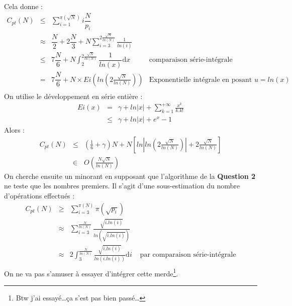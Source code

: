 \documentclass[../main.tex]{subfiles}
\begin{document}
Cela donne :
$$\begin{array}{lcll}
C_{pt}(N) & \leq & \displaystyle\sum_{i = 1}^{\pi(\sqrt{N})}i\dfrac{N}{p_i} \\
& \approx & \dfrac{N}{2} + 2\dfrac{N}{3} + N\displaystyle\sum_{i = 3}^{2\frac{\sqrt{N}}{ln(N)}}\frac{1}{ln(i)} \\
& \leq & 7\dfrac{N}{6} + N\displaystyle\int_{2}^{2\frac{\sqrt{N}}{ln(N)}}\dfrac{1}{ln(x)}\mathrm{d}x & \text{comparaison série-intégrale}\\
& = & 7\dfrac{N}{6} + N\times Ei\left(ln\left(2\frac{\sqrt{N}}{ln(N)}\right)\right) & \text{Exponentielle intégrale en posant $u = ln(x)$} \\
\end{array}$$
On utilise le développement en série entière :
$$\begin{array}{lcl}Ei(x) & = & \gamma + ln|x| + \displaystyle\sum_{k = 1}^{+\infty}\frac{x^k}{k.k!} \\
& \leq & \gamma + ln|x| + e^x - 1
\end{array}$$
Alors :
$$\begin{array}{lcl}C_{pt}(N) & \leq & (\frac{1}{6} + \gamma)N + N\left[ln\left|ln\left(2\frac{\sqrt{N}}{ln(N)}\right)\right| + 2\frac{\sqrt{N}}{ln(N)}\right] \\
& \in & O\left(\frac{N\sqrt{N}}{ln(N)}\right)
\end{array}$$
On cherche ensuite un minorant en supposant que l'algorithme de la \textbf{Question 2} ne teste que les nombres premiers. Il s'agit d'une sous-estimation du nombre d'opérations effectués :
$$\begin{array}{lcll}
C_{pt}(N) & \geq & \displaystyle\sum_{i = 3}^{\pi(N)}\pi(\sqrt{p_i}) \\
 & \approx & \displaystyle\sum_{i = 3}^{\frac{N}{ln(N)}}\frac{\sqrt{i.ln(i)}}{ln(\sqrt{i.ln(i)})} \\
& \approx & 2\displaystyle\int_{3}^{\frac{N}{ln(N)}} \frac{\sqrt{i.ln(i)}}{ln(i.ln(i))}\mathrm{d}i& \text{ par comparaison série-intégrale}\\
\end{array}$$
On ne va pas s'amuser à essayer d'intégrer cette merde\footnote{Btw j'ai essayé\dots ça s'est pas bien passé\dots}.
\end{document}
